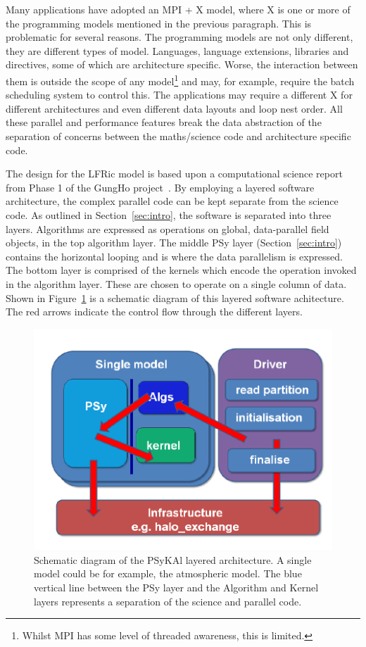 \documentclass[review,times]{elsarticle}
\begin{document}
Many applications have adopted an MPI + X model, where X is one or
more of the programming models mentioned in the previous paragraph. This
is problematic for several reasons. The programming models are not
only different, they are different types of model. Languages, language
extensions, libraries and directives, some of which are architecture
specific. Worse, the interaction between them is outside the scope of
any model\footnote{Whilst MPI has some level of threaded awareness,
  this is limited.} and may, for example, require the batch scheduling
system to control this. The applications may require a different X for
different architectures and even different data layouts and
loop nest order. All these parallel and performance features
break the data abstraction of the separation of concerns between the
maths/science code and architecture specific code.

The design for the LFRic model is based upon a computational science
report from Phase 1 of the GungHo project~\cite{GHP1_CSR}. By
employing a layered software architecture, the complex parallel code
can be kept separate from the science code. As outlined in 
Section~\ref{sec:intro}, the software is separated into three layers.
Algorithms are expressed as operations on global, data-parallel field objects,
in the top algorithm layer. The middle PSy layer (Section~\ref{sec:intro}) 
contains the horizontal looping and is where the data parallelism is expressed. 
The bottom layer is comprised of the kernels which encode the operation invoked in the
algorithm layer. These are chosen to operate on a single column of data. 
Shown in Figure~\ref{fig:psykal} is a schematic diagram of this
layered software achitecture. The red arrows indicate the control flow
through the different layers. 

\begin{figure}
\centering\includegraphics[width=0.8\linewidth]{PSyKAl.pdf}
\caption{\label{fig:psykal} Schematic diagram of the PSyKAl layered
  architecture. A single model could be for example, the atmospheric
  model. The blue vertical line between the PSy layer and the
  Algorithm and Kernel layers represents a separation of the science
  and parallel code.}
\end{figure}
\end{document}
